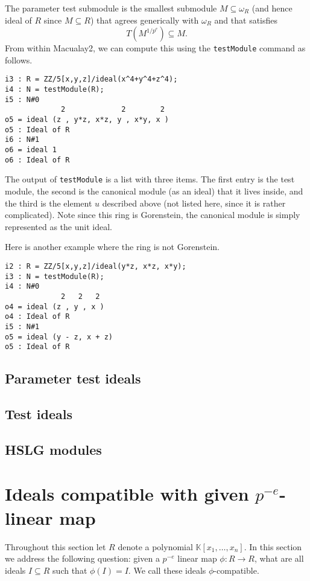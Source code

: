 \documentclass[11pt]{amsart}
\begin{document}
The parameter test submodule is the smallest submodule $M \subseteq \omega_R$ (and hence ideal of $R$ since $M \subseteq R$) that agrees generically with $\omega_R$ and that satisfies
\[
T (M^{1/p^e}) \subseteq M.
\]
From within Macualay2, we can compute this using the {\tt testModule} command as follows.
\begin{verbatim}
i3 : R = ZZ/5[x,y,z]/ideal(x^4+y^4+z^4);
i4 : N = testModule(R);
i5 : N#0
             2             2        2
o5 = ideal (z , y*z, x*z, y , x*y, x )
o5 : Ideal of R
i6 : N#1
o6 = ideal 1
o6 : Ideal of R
\end{verbatim}
The output of {\tt testModule} is a list with three items.  The first entry is the test module, the second is the canonical module (as an ideal) that it lives inside, and the third is the element $u$ described above (not listed here, since it is rather complicated).  Note since this ring is Gorenstein, the canonical module is simply represented as the unit ideal.

Here is another example where the ring is not Gorenstein.  
\begin{verbatim}
i2 : R = ZZ/5[x,y,z]/ideal(y*z, x*z, x*y);
i3 : N = testModule(R);
i4 : N#0
             2   2   2
o4 = ideal (z , y , x )
o4 : Ideal of R
i5 : N#1
o5 = ideal (y - z, x + z)
o5 : Ideal of R
\end{verbatim}


\subsection{Parameter test ideals}

\subsection{Test ideals}

\subsection{HSLG modules}

\section{Ideals compatible with given $p^{-e}$-linear map}

Throughout this section let $R$ denote a polynomial $\mathbb{K}[x_1, \dots, x_n]$. In this section we address the following question:
given a $p^{-e}$ linear map $\phi: R \rightarrow R$, what are all ideals $I\subseteq R$ such that $\phi(I)=I$.
We call these ideals $\phi$-compatible.
\end{document}
